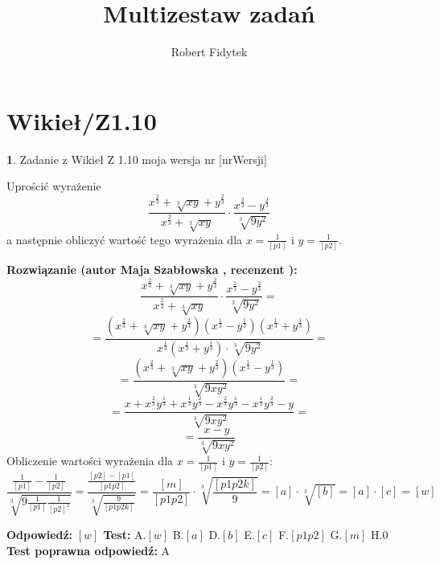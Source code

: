 \documentclass[12pt, a4paper]{article}
\title{Multizestaw zadań}
\author{Robert Fidytek}
\date{}
\theoremstyle{definition} %
\newtheorem{zad}{}
\newcommand{\kategoria}[1]{\section{#1}} %
\newcommand{\zadStart}[1]{\begin{zad}#1\newline} %
\newcommand{\zadStop}{\end{zad}}   %
\newcommand{\rozwStart}[2]{\noindent \textbf{Rozwiązanie (autor #1 , recenzent #2): }\newline} %
\newcommand{\rozwStop}{\newline}                                            %
\newcommand{\odpStart}{\noindent \textbf{Odpowiedź:}\newline}    %
\newcommand{\odpStop}{\newline}                                             %
\newcommand{\testStart}{\noindent \textbf{Test:}\newline} %
\newcommand{\testStop}{\newline} %
\newcommand{\kluczStart}{\noindent \textbf{Test poprawna odpowiedź:}\newline} %
\newcommand{\kluczStop}{\newline} %
\begin{document}
\maketitle


\kategoria{Wikieł/Z1.10}
\zadStart{Zadanie z Wikieł Z 1.10  moja wersja nr [nrWersji]}

Uprościć wyrażenie
$$\frac{x^{\frac{2}{3}}+\sqrt[3]{xy}+y^{\frac{2}{3}}}{x^{\frac{2}{3}}+\sqrt[3]{xy}}\cdot \frac{x^{\frac{2}{3}}-y^{\frac{2}{3}}}{\sqrt[3]{9y^{2}}}$$
a następnie obliczyć wartość tego wyrażenia dla $x=\frac{1}{[p1]}$ i $y=\frac{1}{[p2]}.$
\zadStop

\rozwStart{Maja Szabłowska}{}
$$\frac{x^{\frac{2}{3}}+\sqrt[3]{xy}+y^{\frac{2}{3}}}{x^{\frac{2}{3}}+\sqrt[3]{xy}}\cdot \frac{x^{\frac{2}{3}}-y^{\frac{2}{3}}}{\sqrt[3]{9y^{2}}}=$$
$$=\frac{(x^{\frac{2}{3}}+\sqrt[3]{xy}+y^{\frac{2}{3}})(x^{\frac{1}{3}}-y^{\frac{1}{3}})(x^{\frac{1}{3}}+y^{\frac{1}{3}})}{x^{\frac{1}{3}}(x^{\frac{1}{3}}+y^{\frac{1}{3}})\cdot \sqrt[3]{9y^{2}}}=$$
$$=\frac{(x^{\frac{2}{3}}+\sqrt[3]{xy}+y^{\frac{2}{3}})(x^{\frac{1}{3}}-y^{\frac{1}{3}})}{\sqrt[3]{9xy^{2}}}=$$
$$=\frac{x+x^{\frac{2}{3}}y^{\frac{1}{3}}+x^{\frac{1}{3}}y^{\frac{2}{3}}-x^{\frac{2}{3}}y^{\frac{1}{3}}-x^{\frac{1}{3}}y^{\frac{2}{3}}-y}{\sqrt[3]{9xy^{2}}}=$$
$$=\frac{x-y}{\sqrt[3]{9xy^{2}}}$$
Obliczenie wartości wyrażenia dla $x=\frac{1}{[p1]}$ i $y=\frac{1}{[p2]}$:
$$\frac{\frac{1}{[p1]}-\frac{1}{[p2]}}{\sqrt[3]{9\frac{1}{[p1]}\frac{1}{[p2]^{2}}}}=\frac{\frac{[p2]-[p1]}{[p1p2]}}{\sqrt[3]{\frac{9}{[p1p2k]}}}=\frac{[m]}{[p1p2]}\cdot\sqrt[3]{\frac{[p1p2k]}{9}}=[a]\cdot\sqrt[3]{[b]}=[a]\cdot[c]=[w]$$
\rozwStop


\odpStart
$[w]$
\odpStop
\testStart
A.$[w]$
B.$[a]$
D.$[b]$
E.$[c]$
F.$[p1p2]$
G.$[m]$
H.$0$
\testStop
\kluczStart
A
\kluczStop
\end{document}
